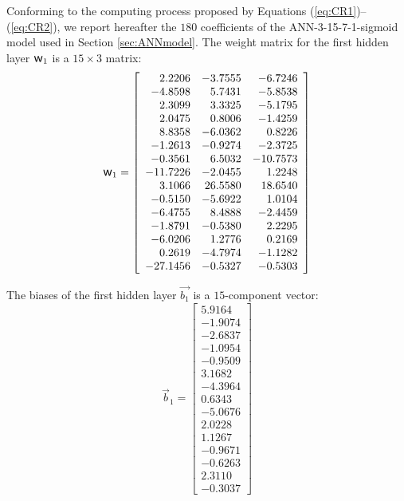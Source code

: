 \documentclass[metals,article,accept,pdftex,moreauthors]{Definitions/mdpi}
\DeclareRobustCommand{\w}{\mbox{\large\ensuremath{\mathsf{w}}}}
\begin{document}
Conforming to the computing process proposed by Equations (\ref{eq:CR1})--(\ref{eq:CR2}), we report hereafter the $180$ coefficients of the ANN-3-15-7-1-sigmoid model used in Section \ref{sec:ANNmodel}.
The weight matrix for the first hidden layer $\w_1$ is a $15\times3$ matrix:
\begin{equation*}
\w_1 = \left[
\begin{array}{rrr}
2.2206 & -3.7555 & -6.7246 \\
-4.8598 & 5.7431 & -5.8538 \\
2.3099 & 3.3325 & -5.1795 \\
2.0475 & 0.8006 & -1.4259 \\
8.8358 & -6.0362 & 0.8226 \\
-1.2613 & -0.9274 & -2.3725 \\
-0.3561 & 6.5032 & -10.7573 \\
-11.7226 & -2.0455 & 1.2248 \\
3.1066 & 26.5580 & 18.6540 \\
-0.5150 & -5.6922 & 1.0104 \\
-6.4755 & 8.4888 & -2.4459 \\
-1.8791 & -0.5380 & 2.2295 \\
-6.0206 & 1.2776 & 0.2169 \\
0.2619 & -4.7974 & -1.1282 \\
-27.1456 & -0.5327 & -0.5303
\end{array}\right]
\end{equation*}

{The} %
 biases of the first hidden layer $\overrightarrow{b_1}$ is a $15$-component vector:
\begin{equation*}
\overrightarrow{b}_1 = \left[
\begin{array}{r}
5.9164 \\
-1.9074 \\
-2.6837 \\
-1.0954 \\
-0.9509 \\
3.1682 \\
-4.3964 \\
0.6343 \\
-5.0676 \\
2.0228 \\
1.1267 \\
-0.9671 \\
-0.6263 \\
2.3110 \\
-0.3037
\end{array}\right]
\end{equation*}
\end{document}
